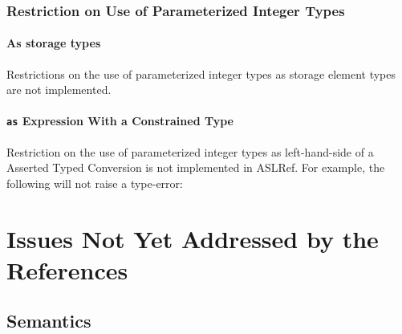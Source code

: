 \documentclass{book}
\begin{document}
\subsection{Restriction on Use of Parameterized Integer Types}

\subsubsection{As storage types}
Restrictions on the use of parameterized integer types as storage element types are not
implemented.


\subsubsection{\texttt{as} Expression With a Constrained Type}

Restriction on the use of parameterized integer types as left-hand-side of a
Asserted Typed Conversion is not implemented in ASLRef.
%
For example, the following will not raise a type-error:


\chapter{Issues Not Yet Addressed by the References}

\section{Semantics}



\end{document}
